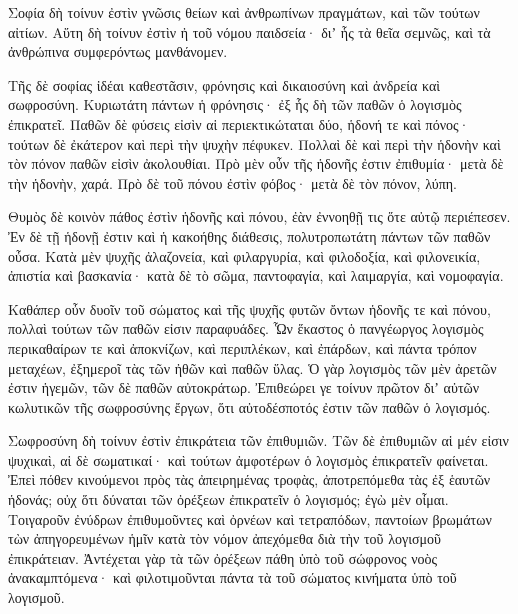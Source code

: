 {Σοφία δὴ τοίνυν ἐστὶν γνῶσις θείων καὶ ἀνθρωπίνων πραγμάτων, καὶ τῶν τούτων αἰτίων.
Αὕτη δὴ τοίνυν ἐστὶν ἠ τοῦ νόμου παιδσεία· διʼ ἧς τὰ θεῖα σεμνῶς, καὶ τὰ ἀνθρώπινα συμφερόντως μανθάνομεν.
\par }{\PP {}Τῆς δὲ σοφίας ἰδέαι καθεστᾶσιν, φρόνησις καὶ δικαιοσύνη καὶ ἀνδρεία καὶ σωφροσύνη.
Κυριωτάτη πάντων ἡ φρόνησις· ἐξ ἧς δὴ τῶν παθῶν ὁ λογισμὸς ἐπικρατεῖ.
Παθῶν δὲ φύσεις εἰσὶν αἱ περιεκτικώταται δύο, ἡδονή τε καὶ πόνος· τούτων δὲ ἐκάτερον καὶ περὶ τὴν ψυχὴν πέφυκεν.
Πολλαὶ δὲ καὶ περὶ τὴν ἡδονὴν καὶ τὸν πόνον παθῶν εἰσὶν ἀκολουθίαι.
Πρὸ μὲν οὖν τῆς ἡδονῆς ἐστιν ἐπιθυμία· μετὰ δὲ τὴν ἡδονὴν, χαρά.
Πρὸ δὲ τοῦ πόνου ἐστὶν φόβος· μετὰ δὲ τὸν πόνον, λύπη.
\par }{\PP {}Θυμὸς δὲ κοινὸν πάθος ἐστὶν ἡδονῆς καὶ πόνου, ἐὰν ἐννοηθῇ τις ὅτε αὐτῷ περιέπεσεν.
Ἐν δὲ τῇ ἡδονῇ ἐστιν καὶ ἡ κακοήθης διάθεσις, πολυτροπωτάτη πάντων τῶν παθῶν οὖσα.
Κατὰ μὲν ψυχῆς ἀλαζονεία, καὶ φιλαργυρία, καὶ φιλοδοξία, καὶ φιλονεικία, ἀπιστία καὶ βασκανία·
κατὰ δὲ τὸ σῶμα, παντοφαγία, καὶ λαιμαργία, καὶ νομοφαγία.
\par }{\PP {}Καθάπερ οὖν δυοῖν τοῦ σώματος καὶ τῆς ψυχῆς φυτῶν ὄντων ἡδονῆς τε καὶ πόνου, πολλαὶ τούτων τῶν παθῶν εἰσιν παραφυάδες.
Ὧν ἕκαστος ὁ πανγέωργος λογισμὸς περικαθαίρων τε καὶ ἀποκνίζων, καὶ περιπλέκων, καὶ ἐπάρδων, καὶ πάντα τρόπον μεταχέων, ἐξημεροῖ τὰς τῶν ἠθῶν καὶ παθῶν ὕλας.
Ὁ γὰρ λογισμὸς τῶν μὲν ἀρετῶν ἐστιν ἡγεμῶν, τῶν δὲ παθῶν αὐτοκράτωρ. Ἐπιθεώρει γε τοίνυν πρῶτον διʼ αὐτῶν κωλυτικῶν τῆς σωφροσύνης ἔργων, ὅτι αὐτοδέσποτός ἐστιν τῶν παθῶν ὁ λογισμός.
\par }{\PP {}Σωφροσύνη δὴ τοίνυν ἐστὶν ἐπικράτεια τῶν ἐπιθυμιῶν.
Τῶν δὲ ἐπιθυμιῶν αἱ μέν εἰσιν ψυχικαὶ, αἱ δὲ σωματικαί· καὶ τούτων ἀμφοτέρων ὁ λογισμὸς ἐπικρατεῖν φαίνεται.
Ἐπεὶ πόθεν κινούμενοι πρὸς τὰς ἀπειρημένας τροφὰς, ἀποτρεπόμεθα τὰς ἐξ ἑαυτῶν ἡδονάς; οὐχ ὅτι δύναται τῶν ὀρέξεων ἐπικρατεῖν ὁ λογισμός; ἐγὼ μὲν οἶμαι.
Τοιγαροῦν ἐνύδρων ἐπιθυμοῦντες καὶ ὀρνέων καὶ τετραπόδων, παντοίων βρωμάτων τὼν ἀπηγορευμένων ἡμῖν κατὰ τὸν νόμον ἀπεχόμεθα διὰ τὴν τοῦ λογισμοῦ ἐπικράτειαν.
Ἀντέχεται γὰρ τὰ τῶν ὀρέξεων πάθη ὑπὸ τοῦ σώφρονος νοὸς ἀνακαμπτόμενα· καὶ φιλοτιμοῦνται πάντα τὰ τοῦ σώματος κινήματα ὑπὸ τοῦ λογισμοῦ.

}
